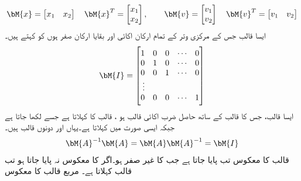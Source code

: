 \begin{gather*}
\begin{aligned}
\bM{x}=
\begin{bmatrix*}[r]
x_1& x_2
\end{bmatrix*} \quad
\bM{x}^T=
\begin{bmatrix*}[r]
x_1\\
x_2
\end{bmatrix*}, \quad \quad
\bM{v}=
\begin{bmatrix*}[r]
v_1\\
v_2
\end{bmatrix*}\quad
\bM{v}^T=
\begin{bmatrix*}[r]
v_1 & v_2
\end{bmatrix*}
\end{aligned}
\end{gather*}
 ایسا  قالب جس کے مرکزی وتر کے تمام ارکان اکائی   اور بقایا  ارکان صفر ہوں کو   کہتے ہیں۔
\begin{align}
\bM{I}=
\begin{bmatrix*}[r]
1&0 &0 & \cdots &0\\
0&1&0&\cdots & 0\\
0&0&1&\cdots &0\\
\vdots &&&&\\
0&0&0&\cdots&1
\end{bmatrix*}
\end{align}
ایسا  قالب، جس کا  قالب کے ساتھ حاصل ضرب اکائی قالب ہو ،   قالب  کا  کہلاتا ہے جسے  لکھا جاتا ہے جبکہ ایسی صورت میں   کہلاتا ہے۔یہاں  اور  دونوں  قالب ہیں۔
\begin{align}
\bM{A}^{-1}\bM{A}=\bM{A}\bM{A}^{-1}=\bM{I}
\end{align}
قالب  کا معکوس تب پایا جاتا ہے جب  کا  غیر صفر ہو۔اگر  کا معکوس نہ پایا جاتا ہو تب   قالب کہلاتا ہے۔ مربع  قالب کا معکوس
